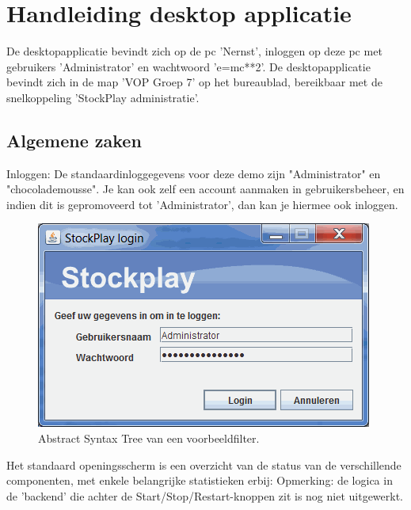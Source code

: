 \chapter{Handleiding desktop applicatie}

De desktopapplicatie bevindt zich op de pc 'Nernst', inloggen op deze pc met gebruikers 'Administrator' en wachtwoord 'e=mc**2'. De desktopapplicatie bevindt zich in de map 'VOP Groep 7' op het bureaublad, bereikbaar met de snelkoppeling 'StockPlay administratie'.

\section{Algemene zaken}

Inloggen:
De standaardinloggegevens voor deze demo zijn "Administrator" en "chocolademousse". Je kan ook zelf een account aanmaken in gebruikersbeheer, en indien dit is gepromoveerd tot 'Administrator', dan kan je hiermee ook inloggen.

\begin{figure}[h!]
	\centering
		\includegraphics[width=\textwidth]{images/handleiding/handleiding1.gif}
	\caption{Abstract Syntax Tree van een voorbeeldfilter.}
\end{figure}

Het standaard openingsscherm is een overzicht van de status van de verschillende componenten, met enkele belangrijke statistieken erbij:
Opmerking: de logica in de 'backend' die achter de Start/Stop/Restart-knoppen zit is nog niet uitgewerkt.

